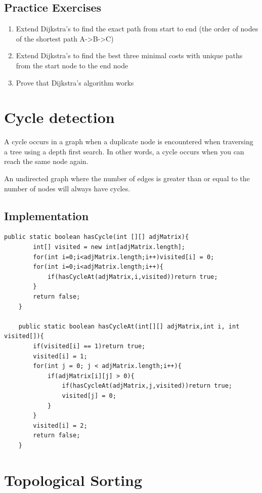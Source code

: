 \documentclass[11pt,oneside]{book}
\begin{document}
\subsection{Practice Exercises}

\begin{enumerate}
\item Extend Dijkstra's to find the exact path from start to end (the order of nodes of the shortest path A->B->C)
\item Extend Dijkstra's to find the best three minimal costs with unique paths from the start node to the end node
\item Prove that Dijkstra's algorithm works
\end{enumerate}
\section{Cycle detection}

A cycle occurs in a graph when a duplicate node is encountered when traversing a tree using a depth first search. In other words, a cycle occurs when you can reach the same node again.

An undirected graph where the number of edges is greater than or equal to the number of nodes will always have cycles.

\subsection{Implementation}

\begin{lstlisting}
public static boolean hasCycle(int [][] adjMatrix){
        int[] visited = new int[adjMatrix.length];
        for(int i=0;i<adjMatrix.length;i++)visited[i] = 0;
        for(int i=0;i<adjMatrix.length;i++){
            if(hasCycleAt(adjMatrix,i,visited))return true;
        }
        return false;
    }
    
    public static boolean hasCycleAt(int[][] adjMatrix,int i, int visited[]){
        if(visited[i] == 1)return true;
        visited[i] = 1;
        for(int j = 0; j < adjMatrix.length;i++){
            if(adjMatrix[i][j] > 0){
                if(hasCycleAt(adjMatrix,j,visited))return true;
                visited[j] = 0;
            }
        }
        visited[i] = 2;
        return false;
    }
\end{lstlisting}
\section{Topological Sorting}
\end{document}
